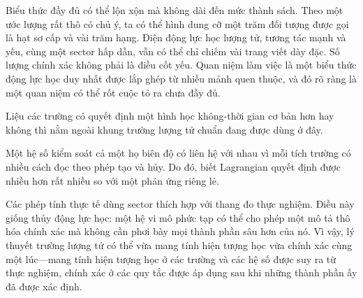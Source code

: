 Biểu thức đầy đủ có thể lộn xộn mà không dài đến mức thành sách. Theo một ước lượng rất thô có chủ ý, ta có thể hình dung cỡ một trăm đối tượng được gọi là hạt sơ cấp và vài trăm hạng. Điện động lực học lượng tử, tương tác mạnh và yếu, cùng một sector hấp dẫn, vẫn có thể chỉ chiếm vài trang viết dày đặc. Số lượng chính xác không phải là điều cốt yếu. Quan niệm làm việc là một biểu thức động lực học duy nhất được lắp ghép từ nhiều mảnh quen thuộc, và đó rõ ràng là một quan niệm có thể rốt cuộc tỏ ra chưa đầy đủ.

Liệu các trường có quyết định một hình học không-thời gian cơ bản hơn hay không thì nằm ngoài khung trường lượng tử chuẩn đang được dùng ở đây.

\begin{classroomqa}
\end{classroomqa}

Một hệ số kiểm soát cả một họ biên độ có liên hệ với nhau vì mỗi tích trường có nhiều cách đọc theo phép tạo và hủy. Do đó, biết Lagrangian quyết định được nhiều hơn rất nhiều so với một phản ứng riêng lẻ.

\begin{classroomqa}
\end{classroomqa}

Các phép tính thực tế dùng sector thích hợp với thang đo thực nghiệm. Điều này giống thủy động lực học: một hệ vi mô phức tạp có thể cho phép một mô tả thô hóa chính xác mà không cần phơi bày mọi thành phần sâu hơn của nó. Vì vậy, lý thuyết trường lượng tử có thể vừa mang tính hiện tượng học vừa chính xác cùng một lúc---mang tính hiện tượng học ở các trường và các hệ số được suy ra từ thực nghiệm, chính xác ở các quy tắc được áp dụng sau khi những thành phần ấy đã được xác định.

